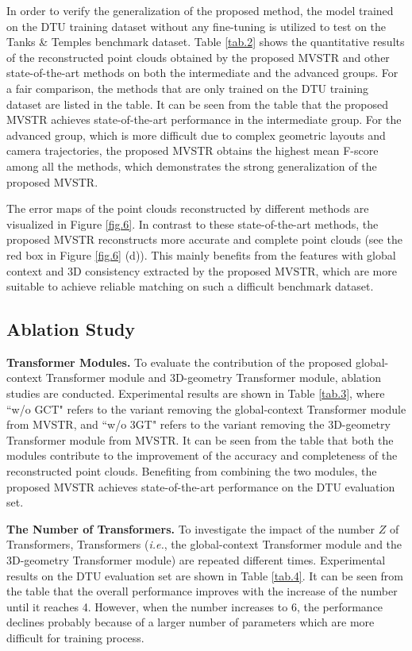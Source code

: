 \documentclass[10pt,twocolumn,letterpaper]{article}
\begin{document}
In order to verify the generalization of the proposed method, the model trained on the DTU training dataset without any fine-tuning is utilized to test on the Tanks \& Temples benchmark dataset. Table \ref{tab.2} shows the quantitative results of the reconstructed point clouds obtained by the proposed MVSTR and other state-of-the-art methods on both the intermediate and the advanced groups. For a fair comparison, the methods that are only trained on the DTU training dataset are listed in the table. It can be seen from the table that the proposed MVSTR achieves state-of-the-art performance in the intermediate group. For the advanced group, which is more difficult due to complex geometric layouts and camera trajectories, the proposed MVSTR obtains the highest mean F-score among all the methods, which demonstrates the strong generalization of the proposed MVSTR. 

The error maps of the point clouds reconstructed by different methods are visualized in Figure \ref{fig.6}. In contrast to these state-of-the-art methods, the proposed MVSTR reconstructs more accurate and complete point clouds (see the red box in Figure \ref{fig.6} (d)). This mainly benefits from the features with global context and 3D consistency extracted by the proposed MVSTR, which are more suitable to achieve reliable matching on such a difficult benchmark dataset.

\subsection{Ablation Study}

{\bf{Transformer Modules.}} To evaluate the contribution of the proposed global-context Transformer module and 3D-geometry Transformer module, ablation studies are conducted. Experimental results are shown in Table \ref{tab.3}, where ``w/o GCT" refers to the variant removing the global-context Transformer module from MVSTR, and ``w/o 3GT" refers to the variant removing the 3D-geometry Transformer module from MVSTR. It can be seen from the table that both the modules contribute to the improvement of the accuracy and completeness of the reconstructed point clouds. Benefiting from combining the two modules, the proposed MVSTR achieves state-of-the-art performance on the DTU evaluation set.

{\bf{The Number of Transformers.}} To investigate the impact of the number $Z$ of Transformers, Transformers (\textit{i.e.}, the global-context Transformer module and the 3D-geometry Transformer module) are repeated different times. Experimental results on the DTU evaluation set are shown in Table \ref{tab.4}. It can be seen from the table that the overall performance improves with the increase of the number until it reaches 4. However, when the number increases to 6, the performance declines probably because of a larger number of parameters which are more difficult for training process.
\end{document}
